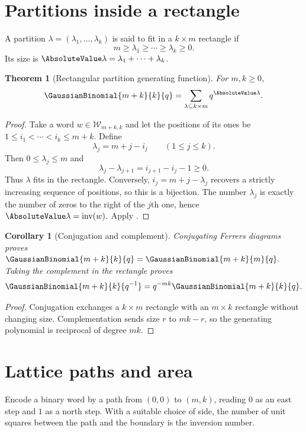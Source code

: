 \documentclass[11pt,a4paper,oneside,openany]{book}
\newtheorem{theorem}{Theorem}[chapter]
\newtheorem{corollary}[corollary]{Corollary}
\theoremstyle{definition}
\theoremstyle{remark}
\newcommand{\inv}{\operatorname{inv}}
\begin{document}
\section{Partitions inside a rectangle}

A partition $\lambda=(\lambda_1,\dots,\lambda_k)$ is said to fit in a $k\times m$ rectangle if
\[
 m\ge\lambda_1\ge\cdots\ge\lambda_k\ge0.
\]
Its size is $\AbsoluteValue\lambda=\lambda_1+\cdots+\lambda_k$.

\begin{theorem}[Rectangular partition generating function]\label{thm:rectangle-partitions}
For $m,k\ge0$,
\[
 \GaussianBinomial{m+k}{k}{q}
 =\sum_{\lambda\subseteq k\times m}q^{\AbsoluteValue\lambda}.
\]
\end{theorem}

\begin{proof}
Take a word $w\in\mathcal W_{m+k,k}$ and let the positions of its ones be
\(
 1\le i_1<\cdots<i_k\le m+k.
\)
Define
\[
 \lambda_j=m+j-i_j\qquad(1\le j\le k).
\]
Then $0\le\lambda_j\le m$ and
\[
 \lambda_j-\lambda_{j+1}=i_{j+1}-i_j-1\ge0.
\]
Thus $\lambda$ fits in the rectangle.  Conversely,
\(
 i_j=m+j-\lambda_j
\)
recovers a strictly increasing sequence of positions, so this is a bijection.  The number $\lambda_j$ is exactly the number of zeros to the right of the $j$th one, hence
\(
 \AbsoluteValue\lambda=\inv(w).
\)
Apply .
\end{proof}

\begin{corollary}[Conjugation and complement]\label{cor:partition-symmetries}
Conjugating Ferrers diagrams proves
\(
 \GaussianBinomial{m+k}{k}{q}=\GaussianBinomial{m+k}{m}{q}.
\)
Taking the complement in the rectangle proves
\[
 \GaussianBinomial{m+k}{k}{q^{-1}}=q^{-mk}\GaussianBinomial{m+k}{k}{q}.
\]
\end{corollary}

\begin{proof}
Conjugation exchanges a $k\times m$ rectangle with an $m\times k$ rectangle without changing size.  Complementation sends size $r$ to $mk-r$, so the generating polynomial is reciprocal of degree $mk$.
\end{proof}

\section{Lattice paths and area}

Encode a binary word by a path from $(0,0)$ to $(m,k)$, reading $0$ as an east step and $1$ as a north step.  With a suitable choice of side, the number of unit squares between the path and the boundary is the inversion number.
\end{document}
